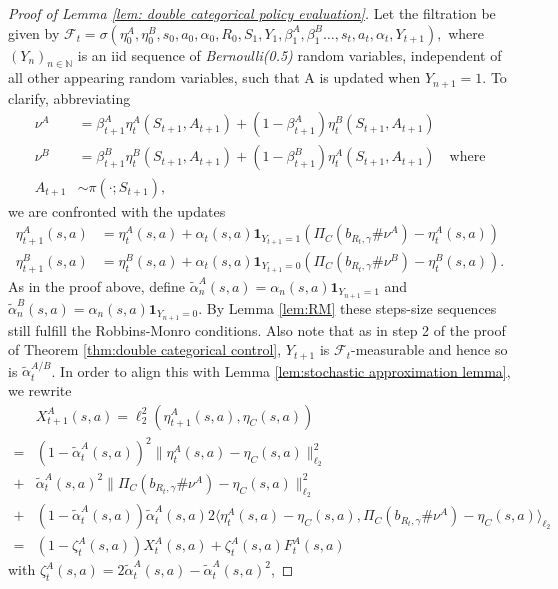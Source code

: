 \documentclass{article}
\newcommand{\cF}{\mathcal{F}}
\newcommand{\N}{\mathbb{N}}
\theoremstyle{plain}
\theoremstyle{definition}
\theoremstyle{remark}
\begin{document}
\begin{proof}[Proof of Lemma \ref{lem: double categorical policy evaluation}]
Let the filtration be given by $\cF_t=\sigma(\eta^A_0,\eta^B_0,s_0,a_0,\alpha_0,R_0,S_1,Y_1,\beta^A_1,\beta^B_1\dots,s_t,a_t,\alpha_t,Y_{t+1}),$ where $(Y_{n})_{n\in\N}$ is an iid sequence of \textit{Bernoulli(0.5)} random variables, independent of all other appearing random variables, such that A is updated when $Y_{n+1}=1$.
To clarify, abbreviating
\begin{align*}
    \nu^A&=\beta_{t+1}^A\eta^A_{t}(S_{t+1},A_{t+1})+(1-\beta_{t+1}^A)\eta^B_{t}(S_{t+1},A_{t+1})\\
    \nu^B&=\beta_{t+1}^B\eta^B_{t}(S_{t+1},A_{t+1})+(1-\beta_{t+1}^B)\eta^A_{t}(S_{t+1},A_{t+1})\quad \text{where}\\
    A_{t+1}&\sim\pi(\cdot;S_{t+1}),
\end{align*}
we are confronted with the updates
    \begin{align*}
        \eta^A_{t+1}(s,a)&=\eta^A_{t}(s,a)+\alpha_t(s,a)\textbf{1}_{Y_{t+1}=1}(\Pi_C(b_{R_t,\gamma}\#\nu^A)-\eta^A_{t}(s,a))\\
        \eta^B_{t+1}(s,a)&=\eta^B_{t}(s,a)+\alpha_t(s,a)\textbf{1}_{Y_{t+1}=0}(\Pi_C(b_{R_t,\gamma}\#\nu^B)-\eta^B_{t}(s,a)).
    \end{align*}
 As in the proof above, define $\tilde\alpha_n^A(s,a)=\alpha_n(s,a)\textbf{1}_{Y_{n+1}=1}$ and $\tilde\alpha_n^B(s,a)=\alpha_n(s,a)\textbf{1}_{Y_{n+1}=0}$. By Lemma \ref{lem:RM} these steps-size sequences still fulfill the Robbins-Monro conditions. Also note that as in step 2 of the proof of Theorem \ref{thm:double categorical control}, $Y_{t+1}$ is $\cF_{t}$-measurable and hence so is $\tilde\alpha_t^{A/B}$.
In order to align this with Lemma \ref{lem:stochastic approximation lemma}, we rewrite
\begin{align*}
    &X^A_{t+1}(s,a)=\ell_2^2(\eta^A_{t+1}(s,a),\eta_C(s,a))\\
    =&(1-\tilde\alpha^A_t(s,a))^2\|\eta^A_{t}(s,a)-\eta_C(s,a)\|_{\ell_2}^2\\
+&{\tilde\alpha^A_t}(s,a)^2\|\Pi_C(b_{R_t,\gamma}\#\nu^A)-\eta_C(s,a)\|_{\ell_2}^2\\
    +&(1-\tilde\alpha^A_t(s,a))\tilde\alpha^A_t(s,a)2\langle\eta^A_{t}(s,a)-\eta_C(s,a),\Pi_C(b_{R_t,\gamma}\#\nu^A)-\eta_C(s,a)\rangle_{\ell_2}\\
    =&(1-\zeta_t^A(s,a))X_{t}^A(s,a)+\zeta_t^A(s,a)F^A_t(s,a) 
\end{align*}
    with $ \zeta_t^A(s,a)=2\tilde\alpha^A_t(s,a)-\tilde\alpha^A_t(s,a)^2$,

\end{proof}
\end{document}
